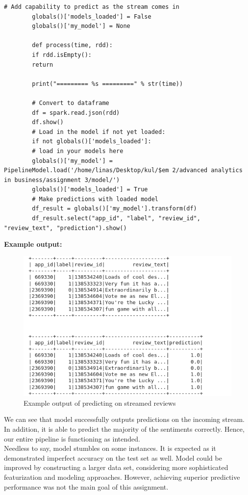\documentclass[11pt, oneside]{article}   	%
\begin{document}
		\begin{lstlisting}[style=mystyle]
		# Add capability to predict as the stream comes in
		globals()['models_loaded'] = False
		globals()['my_model'] = None
		
		def process(time, rdd):
		if rdd.isEmpty():
		return
		
		print("========= %s =========" % str(time))
		
		# Convert to dataframe
		df = spark.read.json(rdd)
		df.show()
		# Load in the model if not yet loaded:
		if not globals()['models_loaded']:
		# load in your models here
		globals()['my_model'] = PipelineModel.load('/home/linas/Desktop/kul/$em 2/advanced analytics in business/assignment 3/model/')
		globals()['models_loaded'] = True
		# Make predictions with loaded model
		df_result = globals()['my_model'].transform(df)
		df_result.select("app_id", "label", "review_id", "review_text", "prediction").show()
		\end{lstlisting}
		
		\textbf{Example output:}
		
	\begin{figure}[h]
		\hspace{1cm} %
		\includegraphics[width=1\linewidth]{output.png}
		\caption{Example output of predicting on streamed reviews}
		\label{figure label}
	\end{figure}
	
	We can see that model successfully outputs predictions on the incoming stream. In addition, it is able to predict the majority of the sentiments correctly. Hence, our entire pipeline is functioning as intended. \\
	Needless to say, model stumbles on some instances. It is expected as it demonstrated imperfect accuracy on the test set as well. Model could be improved by constructing a larger data set, considering more sophisticated featurization and modeling approaches. However, achieving superior predictive performance was not the main goal of this assignment.	
	
\end{document}
